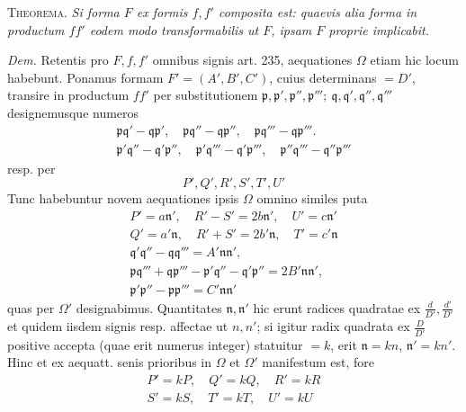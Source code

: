 \textsc{Theorema.} \textit{Si forma $F$ ex formis $f,f'$ composita est: quaevis alia forma in productum $ff'$ eodem modo transformabilis ut $F$, ipsam $F$ proprie implicabit.}

\textit{Dem.} Retentis pro $F,f,f'$ omnibus signis art. 235, aequationes $\Omega$ etiam hic locum habebunt. Ponamus formam $F'=(A',B',C')$, cuius determinans $=D'$, transire in productum $ff'$ per substitutionem $\mathfrak{p},\mathfrak{p}',\mathfrak{p}'',\mathfrak{p}''';\ \mathfrak{q},\mathfrak{q}',\mathfrak{q}'',\mathfrak{q}'''$ designemusque numeros
\[
\begin{gathered}\mathfrak{p}\mathfrak{q}'-\mathfrak{q}\mathfrak{p}',\quad
\mathfrak{p}\mathfrak{q}''-\mathfrak{q}\mathfrak{p}'',\quad
\mathfrak{p}\mathfrak{q}'''-\mathfrak{q}\mathfrak{p}'''.\\
\mathfrak{p}'\mathfrak{q}''-\mathfrak{q}'\mathfrak{p}'',\quad
\mathfrak{p}'\mathfrak{q}'''-\mathfrak{q}'\mathfrak{p}''',\quad
\mathfrak{p}''\mathfrak{q}'''-\mathfrak{q}''\mathfrak{p}'''\end{gathered}
\]
resp. per
\[
P',Q',R',S',T',U'
\]
Tunc habebuntur novem aequationes ipsis $\Omega$ omnino similes puta
\[
\begin{gathered}
P'=a\mathfrak{n}',\quad R'-S'=2b\mathfrak{n}',\quad U'=c\mathfrak{n}'\\
Q'=a'\mathfrak{n},\quad R'+S'=2b'\mathfrak{n},\quad T'=c'\mathfrak{n}\\
\mathfrak{q}'\mathfrak{q}''-\mathfrak{q}\mathfrak{q}'''=A'\mathfrak{n}\mathfrak{n}',\\
\mathfrak{p}\mathfrak{q}'''+\mathfrak{q}\mathfrak{p}'''-\mathfrak{p}'\mathfrak{q}''-\mathfrak{q}'\mathfrak{p}''=2B'\mathfrak{n}\mathfrak{n}',\\
\mathfrak{p}'\mathfrak{p}''-\mathfrak{p}\mathfrak{p}'''=C'\mathfrak{n}\mathfrak{n}'
\end{gathered}
\]
quas per $\Omega'$ designabimus. Quantitates $\mathfrak{n},\mathfrak{n}'$ hic erunt radices quadratae ex $\frac{d}{D'},\frac{d'}{D'}$ et quidem iisdem signis resp. affectae ut $n,n'$; si igitur radix quadrata ex $\frac{D}{D'}$ positive accepta (quae erit numerus integer) statuitur $=k$, erit $\mathfrak{n}=kn$, $\mathfrak{n}'=kn'$. Hinc et ex aequatt. senis prioribus in $\Omega$ et $\Omega'$ manifestum est, fore
\[
\begin{gathered}
P'=kP,\quad Q'=kQ,\quad R'=kR\\
S'=kS,\quad T'=kT,\quad U'=kU
\end{gathered}
\]
